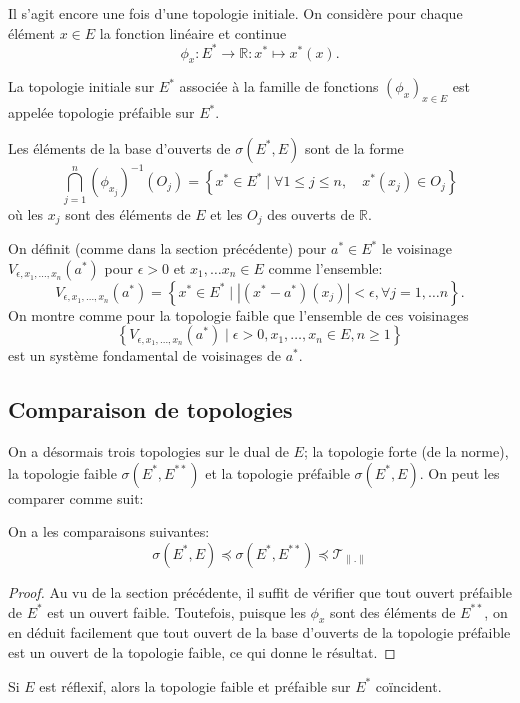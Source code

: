 Il s'agit encore une fois d'une topologie initiale. On considère pour
chaque élément $x\in E$ la fonction linéaire et continue
$$\phi_x: E^*\to\mathbb R: x^*\mapsto x^*(x).$$

\begin{df}
  La topologie initiale sur $E^*$ associée à la famille de fonctions
  $\left(\phi_x\right)_{x\in E}$ est appelée topologie préfaible sur $E^*$.
\end{df}

Les éléments de la base d'ouverts de $\sigma(E^*, E)$ sont
de la forme
\begin{equation*}
  \bigcap_{j=1}^n (\phi_{x_j})^{-1}(O_j) =
  \left\{ x^*\in E^*\mid \forall 1\leq j\leq n,\quad x^*(x_j)\in O_j\right\}
\end{equation*}
où les $x_j$ sont des éléments de $E$ et les $O_j$ des ouverts de $\mathbb R$.

On définit (comme dans la section précédente) pour $a^*\in E^*$ le voisinage
$V_{\epsilon, x_1, \ldots, x_n}(a^*)$ pour $\epsilon > 0$ et
$x_1, \ldots x_n\in E$ comme l'ensemble:
$$ V_{\epsilon, x_1, \ldots, x_n}(a^*) = \left\{
 x^*\in E^* \mid |(x^*-a^*)(x_j) | <\epsilon, \forall j = 1, \ldots n\right\}.$$
On montre comme pour la topologie faible que l'ensemble de ces voisinages
$$\left\{V_{\epsilon, x_1, \ldots, x_n}(a^*)\mid
  \epsilon > 0, x_1, \ldots, x_n\in E, n\geq 1\right\}$$
est un système fondamental de voisinages de $a^*$.

\subsection{Comparaison de topologies}
On a désormais trois topologies sur le dual de $E$; la topologie forte
(de la norme), la topologie faible $\sigma(E^*, E^{**})$ et la topologie
préfaible $\sigma(E^*, E)$. On peut les comparer comme suit:
\begin{prop}
  On a les comparaisons suivantes:
  $$\sigma(E^*, E) \preceq \sigma(E^*, E^{**}) \preceq \mathcal{T}_{\|.\|}$$
\end{prop}
\begin{proof}
  Au vu de la section précédente, il suffit de vérifier que tout ouvert
  préfaible de $E^*$ est un ouvert faible. Toutefois, puisque
  les $\phi_x$ sont des éléments de $E^{**}$, on en déduit facilement
  que tout ouvert de la base d'ouverts de la topologie préfaible
  est un ouvert de la topologie faible, ce qui donne le résultat.
\end{proof}

\begin{rem}
  Si $E$ est réflexif, alors la topologie faible
  et préfaible sur $E^*$ coïncident.
\end{rem}
